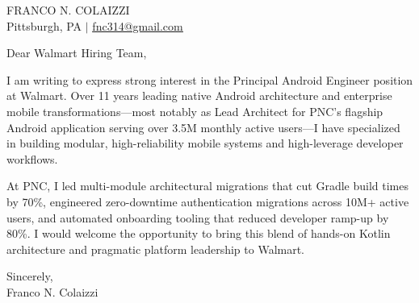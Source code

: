 \documentclass[11pt,letterpaper]{article}
\begin{document}
{\ttfamily\Large\color{color1} FRANCO N. COLAIZZI}\\
Pittsburgh, PA $\mid$ \href{mailto:fnc314@gmail.com}{\uline{fnc314@gmail.com}}

\vspace{12pt}
Dear Walmart Hiring Team,

\vspace{8pt}
I am writing to express strong interest in the Principal Android Engineer position at Walmart. Over 11 years leading native Android architecture and enterprise mobile transformations—most notably as Lead Architect for PNC's flagship Android application serving over 3.5M monthly active users—I have specialized in building modular, high-reliability mobile systems and high-leverage developer workflows.

\vspace{8pt}
At PNC, I led multi-module architectural migrations that cut Gradle build times by 70\%, engineered zero-downtime authentication migrations across 10M+ active users, and automated onboarding tooling that reduced developer ramp-up by 80\%. I would welcome the opportunity to bring this blend of hands-on Kotlin architecture and pragmatic platform leadership to Walmart.

\vspace{12pt}
Sincerely,\\
Franco N. Colaizzi
\end{document}

